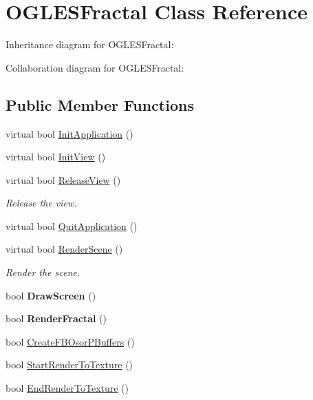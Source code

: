 \hypertarget{class_o_g_l_e_s_fractal}{\section{O\+G\+L\+E\+S\+Fractal Class Reference}
\label{class_o_g_l_e_s_fractal}
}


Inheritance diagram for O\+G\+L\+E\+S\+Fractal\+:


Collaboration diagram for O\+G\+L\+E\+S\+Fractal\+:
\subsection*{Public Member Functions}
\begin{DoxyCompactItemize}
\item 
virtual bool \hyperlink{class_o_g_l_e_s_fractal_a8a7e6550c5fad4a46617f84dd397268a}{Init\+Application} ()
\item 
virtual bool \hyperlink{class_o_g_l_e_s_fractal_ab5df5e00dc51cee8454dc1861a3e6d0a}{Init\+View} ()
\item 
virtual bool \hyperlink{class_o_g_l_e_s_fractal_a34a5544c805d61a705b4b125486aa895}{Release\+View} ()
\begin{DoxyCompactList}\small\item\em Release the view. \end{DoxyCompactList}\item 
virtual bool \hyperlink{class_o_g_l_e_s_fractal_ada5ae960d3ed0181436798dddcf17659}{Quit\+Application} ()
\item 
virtual bool \hyperlink{class_o_g_l_e_s_fractal_a393f1463daad55929c8ff5e7ba604656}{Render\+Scene} ()
\begin{DoxyCompactList}\small\item\em Render the scene. \end{DoxyCompactList}\item 
\hypertarget{class_o_g_l_e_s_fractal_a923bb9771f7de370b56e8a78a3ae109f}{bool {\bfseries Draw\+Screen} ()}\label{class_o_g_l_e_s_fractal_a923bb9771f7de370b56e8a78a3ae109f}

\item 
\hypertarget{class_o_g_l_e_s_fractal_a78e6f7ea398050591fb758abdb671e30}{bool {\bfseries Render\+Fractal} ()}\label{class_o_g_l_e_s_fractal_a78e6f7ea398050591fb758abdb671e30}

\item 
bool \hyperlink{class_o_g_l_e_s_fractal_a749444ef00d8cf9aabb4827f40b7dd1c}{Create\+F\+B\+Osor\+P\+Buffers} ()
\item 
bool \hyperlink{class_o_g_l_e_s_fractal_adff22cdf23c15476a9f1b06794380080}{Start\+Render\+To\+Texture} ()
\item 
bool \hyperlink{class_o_g_l_e_s_fractal_a314865a7303c1e6b97f387ecb055b402}{End\+Render\+To\+Texture} ()
\end{DoxyCompactItemize}


